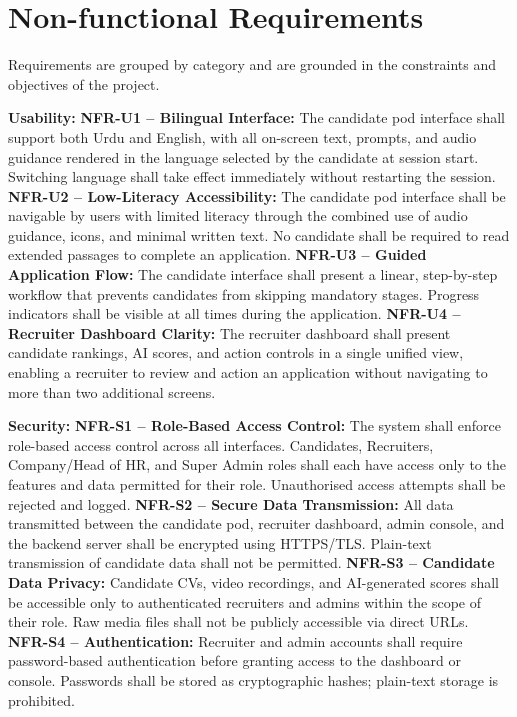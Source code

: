\section{Non-functional Requirements}

Requirements are grouped by category and are grounded in the constraints and objectives of
the project.

\begin{outline}
  \1 \textbf{Usability:}
  \2 \textbf{NFR-U1 -- Bilingual Interface:} The candidate pod interface shall support both Urdu and English, with all on-screen text, prompts, and audio guidance rendered in the language selected by the candidate at session start. Switching language shall take effect immediately without restarting the session.
  \2 \textbf{NFR-U2 -- Low-Literacy Accessibility:} The candidate pod interface shall be navigable by users with limited literacy through the combined use of audio guidance, icons, and minimal written text. No candidate shall be required to read extended passages to complete an application.
  \2 \textbf{NFR-U3 -- Guided Application Flow:} The candidate interface shall present a linear, step-by-step workflow that prevents candidates from skipping mandatory stages. Progress indicators shall be visible at all times during the application.
  \2 \textbf{NFR-U4 -- Recruiter Dashboard Clarity:} The recruiter dashboard shall present candidate rankings, AI scores, and action controls in a single unified view, enabling a recruiter to review and action an application without navigating to more than two additional screens.

  \1 \textbf{Security:}
  \2 \textbf{NFR-S1 -- Role-Based Access Control:} The system shall enforce role-based access control across all interfaces. Candidates, Recruiters, Company/Head of HR, and Super Admin roles shall each have access only to the features and data permitted for their role. Unauthorised access attempts shall be rejected and logged.
  \2 \textbf{NFR-S2 -- Secure Data Transmission:} All data transmitted between the candidate pod, recruiter dashboard, admin console, and the backend server shall be encrypted using HTTPS/TLS. Plain-text transmission of candidate data shall not be permitted.
  \2 \textbf{NFR-S3 -- Candidate Data Privacy:} Candidate CVs, video recordings, and AI-generated scores shall be accessible only to authenticated recruiters and admins within the scope of their role. Raw media files shall not be publicly accessible via direct URLs.
  \2 \textbf{NFR-S4 -- Authentication:} Recruiter and admin accounts shall require password-based authentication before granting access to the dashboard or console. Passwords shall be stored as cryptographic hashes; plain-text storage is prohibited.


\end{outline}

